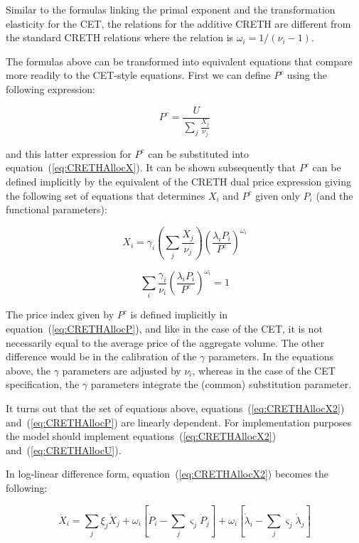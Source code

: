 Similar to the formulas linking the primal exponent and the transformation
elasticity for the CET, the relations for the additive CRETH are different from
the standard CRETH relations where the relation is $\omega_i = 1/(\nu_i-1)$.

The formulas above can be transformed into equivalent equations
that compare more readily to the CET-style equations. First we can define
$P^c$ using the following expression:

\begin{displaymath}
P^c=\frac{U}{\sum_j{\frac{X_j}{\nu_j}}}
\end{displaymath}

\noindent and this latter expression for $P^c$ can be substituted into equation~(\ref{eq:CRETHAllocX}).
It can be shown subsequently that $P^c$ can be defined implicitly by the equivalent of the
CRETH dual price expression giving the following set of equations that determines
$X_i$ and $P^c$ given only $P_i$ (and the functional parameters):

\begin{equation}
\label{eq:CRETHAllocX2}
X_i = \gamma_i \left(\sum_j{\frac{X_j}{\nu_j}} \right)
\left( \frac{\lambda_i P_i}{P^c}\right)^{\omega_i}
\end{equation}

\begin{equation}
\label{eq:CRETHAllocP}
\sum_i{\frac{\gamma_i}{\nu_i} \left( \frac{\lambda_i P_i}{P^c}\right)^{\omega_i}} = 1
\end{equation}

The price index given by $P^c$ is defined implicitly in equation~(\ref{eq:CRETHAllocP}), and
like in the case of the CET, it is not necessarily equal to the average price of the aggregate volume. The other
difference would be in the calibration of the $\gamma$ parameters. In the equations above, the
$\gamma$ parameters are adjusted by $\nu_i$, whereas in the case of the CET specification, the
$\gamma$ parameters integrate the (common) substitution parameter.

It turns out that the set of equations above, equations~(\ref{eq:CRETHAllocX2}) and~(\ref{eq:CRETHAllocP}) are
linearly dependent. For implementation purposes the model should
implement equations~(\ref{eq:CRETHAllocX2}) and~(\ref{eq:CRETHAllocU}).

In log-linear difference form, equation~(\ref{eq:CRETHAllocX2}) becomes the following:

\begin{equation}
\label{eq:CRETHAllocXlin}
\dot X_i = \sum_j{\xi_j \dot X_j}
+ \omega_i\left[ \dot P_i - \sum_j{\varsigma_j} \dot P_j\right]
+ \omega_i\left[ \dot \lambda_i - \sum_j{\varsigma_j} \dot \lambda_j \right]
\end{equation}

